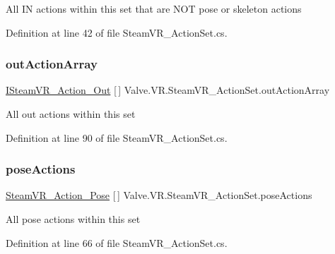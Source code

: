 All IN actions within this set that are N\+OT pose or skeleton actions 



Definition at line 42 of file Steam\+V\+R\+\_\+\+Action\+Set.\+cs.

\mbox{\label{class_valve_1_1_v_r_1_1_steam_v_r___action_set_aec75fd69b96d1f0f7dd0c807885244fe}} 
\subsubsection{\texorpdfstring{outActionArray}{outActionArray}}
{\footnotesize\ttfamily \mbox{\hyperlink{interface_valve_1_1_v_r_1_1_i_steam_v_r___action___out}{I\+Steam\+V\+R\+\_\+\+Action\+\_\+\+Out}} \mbox{[}$\,$\mbox{]} Valve.\+V\+R.\+Steam\+V\+R\+\_\+\+Action\+Set.\+out\+Action\+Array\hspace{0.3cm}{\ttfamily [get]}}



All out actions within this set 



Definition at line 90 of file Steam\+V\+R\+\_\+\+Action\+Set.\+cs.

\mbox{\label{class_valve_1_1_v_r_1_1_steam_v_r___action_set_ae523ca47e6a064f396bcebb6f50d7e75}} 
\subsubsection{\texorpdfstring{poseActions}{poseActions}}
{\footnotesize\ttfamily \mbox{\hyperlink{class_valve_1_1_v_r_1_1_steam_v_r___action___pose}{Steam\+V\+R\+\_\+\+Action\+\_\+\+Pose}} \mbox{[}$\,$\mbox{]} Valve.\+V\+R.\+Steam\+V\+R\+\_\+\+Action\+Set.\+pose\+Actions\hspace{0.3cm}{\ttfamily [get]}}



All pose actions within this set 



Definition at line 66 of file Steam\+V\+R\+\_\+\+Action\+Set.\+cs.

